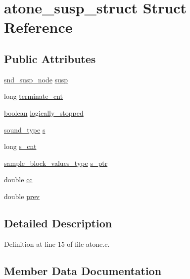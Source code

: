 \hypertarget{structatone__susp__struct}{}\section{atone\+\_\+susp\+\_\+struct Struct Reference}
\label{structatone__susp__struct}
\subsection*{Public Attributes}
\begin{DoxyCompactItemize}
\item 
\hyperlink{sound_8h_a6b268203688a934bd798ceb55f85d4c0}{snd\+\_\+susp\+\_\+node} \hyperlink{structatone__susp__struct_ac3e35d355cd9b646c902cf055a134c7d}{susp}
\item 
long \hyperlink{structatone__susp__struct_a8ede2f875b503b9e5ac8837c8ec3fbc0}{terminate\+\_\+cnt}
\item 
\hyperlink{cext_8h_a7670a4e8a07d9ebb00411948b0bbf86d}{boolean} \hyperlink{structatone__susp__struct_aaccd0a3b8a4d11bb14a7559713714e14}{logically\+\_\+stopped}
\item 
\hyperlink{sound_8h_a792cec4ed9d6d636d342d9365ba265ea}{sound\+\_\+type} \hyperlink{structatone__susp__struct_a4261aab27d908105c65d3672fdf5fd56}{s}
\item 
long \hyperlink{structatone__susp__struct_aff0792e76463d11d549386b253f1d5a8}{s\+\_\+cnt}
\item 
\hyperlink{sound_8h_a83d17f7b465d1591f27cd28fc5eb8a03}{sample\+\_\+block\+\_\+values\+\_\+type} \hyperlink{structatone__susp__struct_a3439f86111f0a79822da1cc68e643fbf}{s\+\_\+ptr}
\item 
double \hyperlink{structatone__susp__struct_ad0dfae4adf154018aadf5c67bf73de36}{cc}
\item 
double \hyperlink{structatone__susp__struct_a45e01f25c0e80bb34406cf4ca156504a}{prev}
\end{DoxyCompactItemize}


\subsection{Detailed Description}


Definition at line 15 of file atone.\+c.



\subsection{Member Data Documentation}

